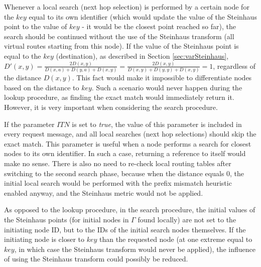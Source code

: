 Whenever a local search (next hop selection) is performed by a certain node for the $key$ equal to its own identifier (which would update the value of the Steinhaus point to the value of $key$ - it would be the closest point reached so far), the search should be continued without the use of the Steinhaus transform (all virtual routes starting from this node). If the value of the Steinhaus point is equal to the $key$ (destination), as described in Section \ref{sec:varSteinhaus}, $D'(x,y) = \frac{2D(x,y)}{D(x,a) + D(y,a) + D(x,y)} = \frac{2D(x,y)}{D(x,y) + D(y,y) + D(x,y)} = 1$, regardless of the distance $D(x, y)$. This fact would make it impossible to differentiate nodes based on the distance to $key$. Such a scenario would never happen during the lookup procedure, as finding the exact match would immediately return it. However, it is very important when considering the search procedure.

If the parameter $ITN$ is set to \emph{true}, the value of this parameter is included in every request message, and all local searches (next hop selections) should skip the exact match. This parameter is useful when a node performs a search for closest nodes to its own identifier. In such a case, returning a reference to itself would make no sense. There is also no need to re-check local routing tables after switching to the second search phase, because when the distance equals 0, the initial local search would be performed with the prefix mismatch heuristic enabled anyway, and the Steinhaus metric would not be applied.

As opposed to the lookup procedure, in the search procedure, the initial values of the Steinhaus points (for initial nodes in $\Gamma$ found locally) are not set to the initiating node ID, but to the IDs of the initial search nodes themselves. If the initiating node is closer to $key$ than the requested node (at one extreme equal to $key$, in which case the Steinhaus transform would never be applied), the influence of using the Steinhaus transform could possibly be reduced.








